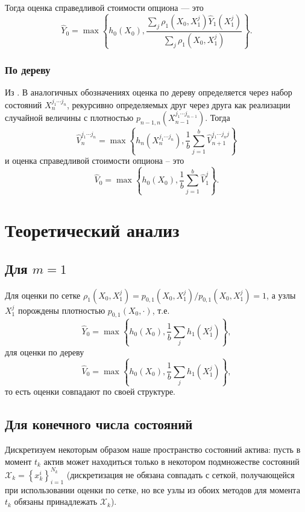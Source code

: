 \documentclass[specialist,
               substylefile = ../spbu.rtx,
               subf,href,colorlinks=true, 10pt]{disser}
\newcommand{\Vhat}{\hat{V}}
\newcommand{\maxset}[1]{\max\left\lbrace#1\right\rbrace}
\begin{document}
Тогда оценка справедливой стоимости опциона --- это $$\hat Y_0 = \max\left\lbrace h_0(X_0), \frac{\sum_j \rho_{1}(X_0, X_1^j) \hat Y_{1}(X_1^j)}{\sum_j \rho_{1}(X_0, X_1^j)} \right\rbrace.$$


\subsection{По дереву} %

Из \cite{Broadie1997,Glasserman2004}. В аналогичных обозначениях оценка по дереву определяется через набор состояний $X_n^{j_1\cdots j_n}$, рекурсивно определяемых друг через друга как реализации случайной величины с плотностью $p_{n-1, n}(X_{n-1}^{j_1\cdots j_{n-1}})$. Тогда
$$\hat V_n^{j_1\cdots j_n} = \maxset{ h_n(X_n^{j_1\cdots j_n}), \frac{1}{b}\sum_{j=1}^b \hat V_{n+1}^{j_1\cdots j_n j}}$$
и оценка справедливой стоимости опциона -- это $$\hat V_0 = \maxset{ h_0(X_0), \frac{1}{b}\sum_{j=1}^b \hat V_{1}^{j}}.$$

\chapter{Теоретический анализ}
\section{Для $m = 1$} %
Для оценки по сетке $\rho_{1}(X_0, X_1^j) = p_{0, 1}(X_0, X_1^j) / p_{0, 1}(X_0, X_1^j) = 1$, а узлы $X_1^j$ порождены плотностью $p_{0, 1}(X_0, \cdot)$, т.е. 
$$\hat Y_0 = \maxset{ h_0(X_0), \frac{1}{b}\sum_j h_1(X_1^j) },$$
для оценки по дереву $$\Vhat_0 = \maxset{ h_0(X_0), \frac{1}{b} \sum_j h_1(X_1^j) },$$
то есть оценки совпадают по своей структуре.

\section{Для конечного числа состояний} %
Дискретизуем некоторым образом наше пространство состояний актива: пусть в момент $t_k$ актив может находиться только в некотором подмножестве состояний $\mathcal X_k = \left\lbrace x_{k}^i \right\rbrace_{i = 1}^{N_k}$ (дискретизация не обязана совпадать с сеткой, получающейся при использовании оценки по сетке, но все узлы из обоих методов для момента $t_k$ обязаны принадлежать $\mathcal X_k$).
\end{document}
